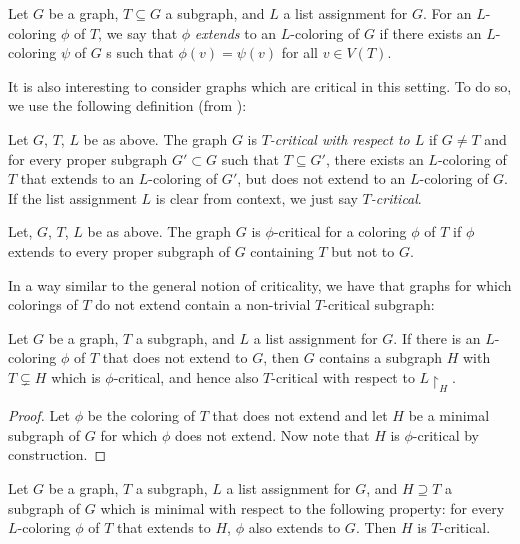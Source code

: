 \begin{definition}[Extending]
	Let $G$ be a graph, $T \subseteq G$ a subgraph, and $L$ a list assignment
	for $G$. For an $L$-coloring $\phi$ of $T$, we say that $\phi$ \emph{extends}
	to an $L$-coloring of $G$ if there exists an $L$-coloring $\psi$ of $G$
s	such that $\phi(v) = \psi(v)$ for all $v \in V(T)$. 
	
\end{definition}

It is also interesting to consider graphs which are critical in this setting. To do so, we use the following definition (from \cite{fivelistcoloring2}):

\begin{definition}[$T$-critical]
	Let $G$, $T$, $L$ be as above. The graph $G$ is \emph{$T$-critical with respect to $L$} if $G \neq T$ and for every proper subgraph $G' \subset G$ such that $T \subseteq G'$, there exists an $L$-coloring of $T$ that extends to an $L$-coloring of $G'$, but does not extend to an $L$-coloring of $G$. If the list assignment $L$ is clear from context, we just say \emph{$T$-critical}.
\end{definition}

\begin{definition}
	Let, $G$, $T$, $L$ be as above. The graph $G$ is $\phi$-critical for a coloring $\phi$ of $T$ if $\phi$ extends to every proper subgraph of $G$ containing $T$ but not to $G$.
\end{definition}

In a way similar to the general notion of criticality, we have that graphs for which colorings of $T$ do not extend contain a non-trivial $T$-critical subgraph:

\begin{lemma}
Let $G$ be a graph, $T$ a subgraph, and $L$ a list assignment for $G$. If there 
is an $L$-coloring $\phi$ of $T$ that does not extend to $G$, 
then $G$ contains a subgraph $H$ with $T \subsetneq H$ which 
is $\phi$-critical, and hence also $T$-critical with respect 
to $L\restriction_H$. 
\end{lemma}

\begin{proof}
Let $\phi$ be the coloring of $T$ that does not extend and let $H$ be a minimal subgraph 
of $G$ for which $\phi$ does not extend. Now note that $H$ is $\phi$-critical 
by construction.
\end{proof}

\begin{lemma}
\label{minimalsubgraphlemma}
Let $G$ be a graph, $T$ a subgraph, $L$ a list assignment for $G$, and $H \supseteq T$ 
a subgraph of $G$ which is minimal with respect to the following property: 
for every $L$-coloring $\phi$ of $T$ that extends to $H$, $\phi$ also extends to $G$. 
Then $H$ is $T$-critical.
\end{lemma}


